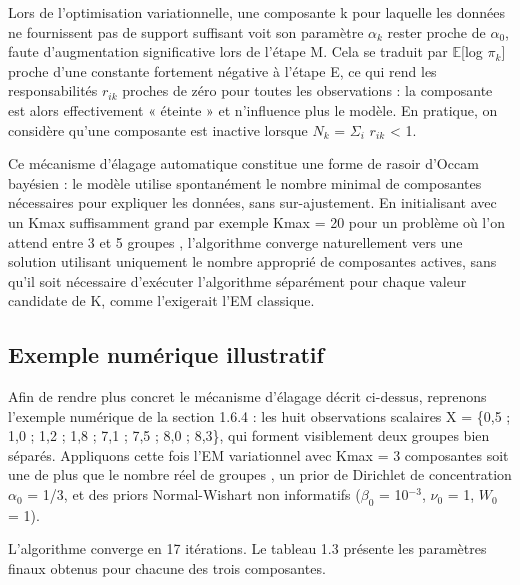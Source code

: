 Lors de l'optimisation variationnelle, une composante k pour laquelle les données ne fournissent pas de support suffisant voit son paramètre $\alpha _{k}$ rester proche de $\alpha _{0}$, faute d'augmentation significative lors de l'étape M. Cela se traduit par $\mathbb{E}$[log $\pi _{k}$] proche d'une constante fortement négative à l'étape E, ce qui rend les responsabilités $r_{ik}$ proches de zéro pour toutes les observations : la composante est alors effectivement « éteinte » et n'influence plus le modèle. En pratique, on considère qu'une composante est inactive lorsque $N_{k}$ = $\Sigma _{i}$ $r_{ik}$ < 1.

Ce mécanisme d'élagage automatique constitue une forme de rasoir d'Occam bayésien : le modèle utilise spontanément le nombre minimal de composantes nécessaires pour expliquer les données, sans sur-ajustement. En initialisant avec un Kmax suffisamment grand  par exemple Kmax = 20 pour un problème où l'on attend entre 3 et 5 groupes , l'algorithme converge naturellement vers une solution utilisant uniquement le nombre approprié de composantes actives, sans qu'il soit nécessaire d'exécuter l'algorithme séparément pour chaque valeur candidate de K, comme l'exigerait l'EM classique.

\subsection{Exemple numérique illustratif}
Afin de rendre plus concret le mécanisme d'élagage décrit ci-dessus, reprenons l'exemple numérique de la section 1.6.4 : les huit observations scalaires X = \{0,5 ; 1,0 ; 1,2 ; 1,8 ; 7,1 ; 7,5 ; 8,0 ; 8,3\}, qui forment visiblement deux groupes bien séparés. Appliquons cette fois l'EM variationnel avec Kmax = 3 composantes  soit une de plus que le nombre réel de groupes , un prior de Dirichlet de concentration $\alpha _{0}$ = 1/3, et des priors Normal-Wishart non informatifs ($\beta _{0}$ = 10$^{-3}$, $\nu _{0}$ = 1, $W_{0}$ = 1).

L'algorithme converge en 17 itérations. Le tableau 1.3 présente les paramètres finaux obtenus pour chacune des trois composantes.

